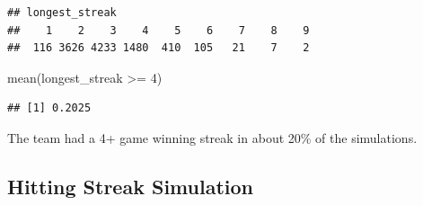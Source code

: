 \documentclass[
  11pt,
]{book}
\newenvironment{Shaded}{\begin{snugshade}}{\end{snugshade}}
\newcommand{\AttributeTok}[1]{\textcolor[rgb]{0.77,0.63,0.00}{#1}}
\newcommand{\CommentTok}[1]{\textcolor[rgb]{0.56,0.35,0.01}{\textit{#1}}}
\newcommand{\ConstantTok}[1]{\textcolor[rgb]{0.00,0.00,0.00}{#1}}
\newcommand{\ControlFlowTok}[1]{\textcolor[rgb]{0.13,0.29,0.53}{\textbf{#1}}}
\newcommand{\DecValTok}[1]{\textcolor[rgb]{0.00,0.00,0.81}{#1}}
\newcommand{\FloatTok}[1]{\textcolor[rgb]{0.00,0.00,0.81}{#1}}
\newcommand{\FunctionTok}[1]{\textcolor[rgb]{0.00,0.00,0.00}{#1}}
\newcommand{\NormalTok}[1]{#1}
\newcommand{\OtherTok}[1]{\textcolor[rgb]{0.56,0.35,0.01}{#1}}
\newcommand{\SpecialCharTok}[1]{\textcolor[rgb]{0.00,0.00,0.00}{#1}}
\theoremstyle{definition}
\theoremstyle{definition}
\theoremstyle{definition}
\theoremstyle{definition}
\theoremstyle{remark}
\begin{document}
\begin{Shaded}
\end{Shaded}

\begin{verbatim}
## longest_streak
##    1    2    3    4    5    6    7    8    9 
##  116 3626 4233 1480  410  105   21    7    2
\end{verbatim}

\begin{Shaded}
\begin{Highlighting}[]
\FunctionTok{mean}\NormalTok{(longest\_streak }\SpecialCharTok{\textgreater{}=} \DecValTok{4}\NormalTok{)}
\end{Highlighting}
\end{Shaded}

\begin{verbatim}
## [1] 0.2025
\end{verbatim}

The team had a 4+ game winning streak in about 20\% of the simulations.

\newpage

\hypertarget{hitting-streak-simulation}{%
\subsection{Hitting Streak Simulation}\label{hitting-streak-simulation}}
\end{document}
